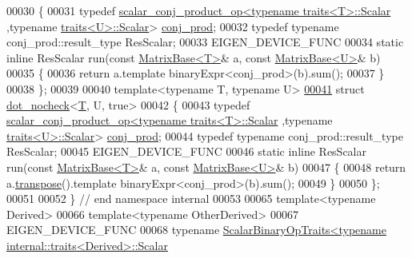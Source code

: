 \begin{DoxyCode}
00030 \{
00031   \textcolor{keyword}{typedef} \hyperlink{struct_eigen_1_1internal_1_1scalar__conj__product__op}{scalar\_conj\_product\_op<typename traits<T>::Scalar}
      ,\textcolor{keyword}{typename} \hyperlink{struct_eigen_1_1internal_1_1traits}{traits<U>::Scalar}> \hyperlink{struct_eigen_1_1internal_1_1scalar__conj__product__op}{conj\_prod};
00032   \textcolor{keyword}{typedef} \textcolor{keyword}{typename} conj\_prod::result\_type ResScalar;
00033   EIGEN\_DEVICE\_FUNC
00034   \textcolor{keyword}{static} \textcolor{keyword}{inline} ResScalar run(\textcolor{keyword}{const} \hyperlink{group___core___module_class_eigen_1_1_matrix_base}{MatrixBase<T>}& a, \textcolor{keyword}{const} 
      \hyperlink{group___core___module_class_eigen_1_1_matrix_base}{MatrixBase<U>}& b)
00035   \{
00036     \textcolor{keywordflow}{return} a.template binaryExpr<conj\_prod>(b).sum();
00037   \}
00038 \};
00039 
00040 \textcolor{keyword}{template}<\textcolor{keyword}{typename} T, \textcolor{keyword}{typename} U>
\hyperlink{struct_eigen_1_1internal_1_1dot__nocheck_3_01_t_00_01_u_00_01true_01_4}{00041} \textcolor{keyword}{struct }\hyperlink{struct_eigen_1_1internal_1_1dot__nocheck}{dot\_nocheck}<\hyperlink{group___sparse_core___module}{T}, U, true>
00042 \{
00043   \textcolor{keyword}{typedef} \hyperlink{struct_eigen_1_1internal_1_1scalar__conj__product__op}{scalar\_conj\_product\_op<typename traits<T>::Scalar}
      ,\textcolor{keyword}{typename} \hyperlink{struct_eigen_1_1internal_1_1traits}{traits<U>::Scalar}> \hyperlink{struct_eigen_1_1internal_1_1scalar__conj__product__op}{conj\_prod};
00044   \textcolor{keyword}{typedef} \textcolor{keyword}{typename} conj\_prod::result\_type ResScalar;
00045   EIGEN\_DEVICE\_FUNC
00046   \textcolor{keyword}{static} \textcolor{keyword}{inline} ResScalar run(\textcolor{keyword}{const} \hyperlink{group___core___module_class_eigen_1_1_matrix_base}{MatrixBase<T>}& a, \textcolor{keyword}{const} 
      \hyperlink{group___core___module_class_eigen_1_1_matrix_base}{MatrixBase<U>}& b)
00047   \{
00048     \textcolor{keywordflow}{return} a.\hyperlink{group___core___module_ac8952c19644a4ac7e41bea45c19b909c}{transpose}().template binaryExpr<conj\_prod>(b).sum();
00049   \}
00050 \};
00051 
00052 \} \textcolor{comment}{// end namespace internal}
00053 
00065 \textcolor{keyword}{template}<\textcolor{keyword}{typename} Derived>
00066 \textcolor{keyword}{template}<\textcolor{keyword}{typename} OtherDerived>
00067 EIGEN\_DEVICE\_FUNC
00068 \textcolor{keyword}{typename} \hyperlink{group___core___module_struct_eigen_1_1_scalar_binary_op_traits}{ScalarBinaryOpTraits<typename internal::traits<Derived>::Scalar}

\end{DoxyCode}

